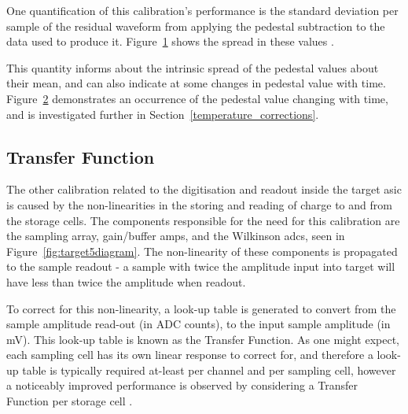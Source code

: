\begin{figure}
	\caption[Spread of sample values from the residual waveforms resulting from applying the waveforms to the data used to produce them.]{} 
	\label{fig:pedestalresiduals}
\end{figure}

\begin{figure}
	\caption[Same as \ref{fig:pedestalresiduals}, but split into increments of 10,000 events.]{} 
	\label{fig:pedestalresidualssplit}
\end{figure}

One quantification of this calibration's performance is the standard deviation per sample of the residual waveform from applying the pedestal subtraction to the data used to produce it. Figure~\ref{fig:pedestalresiduals} shows the spread in these values . 

This quantity informs about the intrinsic spread of the pedestal values about their mean, and can also indicate at some changes in pedestal value with time. Figure~\ref{fig:pedestalresidualssplit} demonstrates an occurrence of the pedestal value changing with time, and is investigated further in Section~\ref{temperature_corrections}.

\subsection{Transfer Function}

The other calibration related to the digitisation and readout inside the \gls{target} \gls{asic} is caused by the non-linearities in the storing and reading of charge to and from the storage cells. The components responsible for the need for this calibration are the sampling array, gain/buffer amps, and the Wilkinson \glspl{adc}, seen in Figure~\ref{fig:target5diagram}. The non-linearity of these components is propagated to the sample readout - a sample with twice the amplitude input into \gls{target} will have less than twice the amplitude when readout.

To correct for this non-linearity, a look-up table is generated to convert from the sample amplitude read-out (in ADC counts), to the input sample amplitude (in mV). This look-up table is known as the Transfer Function. As one might expect, each sampling cell has its own linear response to correct for, and therefore a look-up table is typically required at-least per channel and per sampling cell, however a noticeably improved performance is observed by considering a Transfer Function per storage cell .

